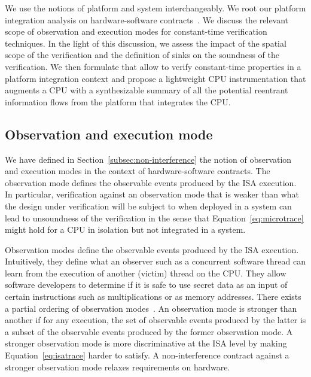 We use the notions of platform and system interchangeably.
We root our platform integration analysis on hardware-software contracts~\cite{guarnieri2021hardware}.
We discuss the relevant scope of observation and execution modes for constant-time verification techniques.
In the light of this discussion, we assess the impact of the spatial scope of the verification and the definition of sinks on the soundness of the verification.
We then formulate \pics that allow to verify constant-time properties in a platform integration context and propose a lightweight CPU instrumentation that augments a CPU with a synthesizable summary of all the potential reentrant information flows from the platform that integrates the CPU.


\subsection{Observation and execution mode}
\label{subsec:observation_mode}

We have defined in Section~\ref{subsec:non-interference} the notion of observation and execution modes in the context of hardware-software contracts.
The observation mode defines the observable events produced by the ISA execution.
In particular, verification against an observation mode that is weaker than what the design under verification will be subject to when deployed in a system can lead to unsoundness of the verification in the sense that Equation~\ref{eq:microtrace} might hold for a CPU in isolation but not integrated in a system.

Observation modes define the observable events produced by the ISA execution.
Intuitively, they define what an observer such as a concurrent software thread can learn from the execution of another (victim) thread on the CPU.
They allow software developers to determine if it is safe to use secret data as an input of certain instructions such as multiplications or as memory addresses.
There exists a partial ordering of observation modes~\cite{guarnieri2021hardware}.
An observation mode is stronger than another if for any execution, the set of observable events produced by the latter is a subset of the observable events produced by the former observation mode. 
A stronger observation mode is more discriminative at the ISA level by making Equation~\ref{eq:isatrace} harder to satisfy.
A non-interference contract against a stronger observation mode relaxes requirements on hardware.

